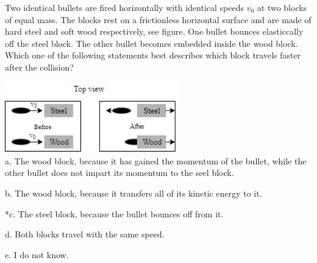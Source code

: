 
Two identical bullets are fired horizontally with identical speeds $v_0$ at two blocks of equal mass. The blocks rest on a frictionless horizontal surface and are made of hard steel and soft wood respectively, see figure. One bullet bounces elasticcally off the steel block. The other bullet becomes embedded inside the wood block.
Which one of the following statements best describes which block travels faster after the collision?

\includegraphics[width=3in]{../../Images/ImpulseAndMomentumQ1.png}\\

a. The wood block, because it has gained the momentum of the bullet, while the other bullet does not impart its momentum to the seel block.

b. The wood block, because it transfers all of its kinetic energy to it.

*c. The steel block, because the bullet bounces off from it.

d. Both blocks travel with the same speed.

e. I do not know.\\
